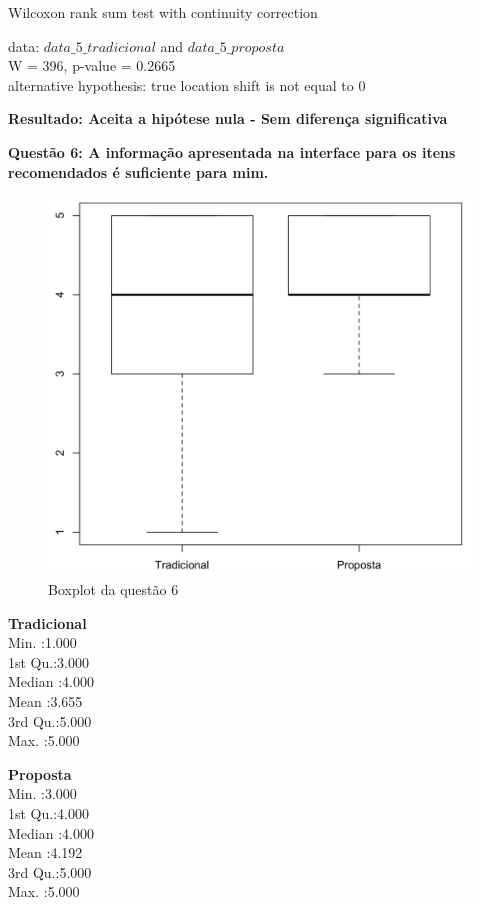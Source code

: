 Wilcoxon rank sum test with continuity correction

\noindent
data:  $data\_5\_tradicional$ and $data\_5\_proposta$\\
W = 396, p-value = 0.2665\\
alternative hypothesis: true location shift is not equal to 0

\textbf{Resultado: Aceita a hipótese nula - Sem diferença significativa}

\newpage
\textbf{Questão 6: A informação apresentada na interface para os itens recomendados é suficiente para mim.}

\begin{figure}[htb]
  \caption{\label{fig:questao6-boxplot}Boxplot da questão 6}
  \begin{center}
      \includegraphics[scale=0.4]{./Figuras/questao6-boxplot.png}
  \end{center}
\end{figure}

\begin{multicols}{2}

\noindent\textbf{Tradicional}\\
Min.   :1.000\\
1st Qu.:3.000\\
Median :4.000\\
Mean   :3.655\\
3rd Qu.:5.000\\
Max.   :5.000\\
\columnbreak

\noindent\textbf{Proposta}\\
Min.   :3.000\\
1st Qu.:4.000\\
Median :4.000\\
Mean   :4.192\\
3rd Qu.:5.000\\
Max.   :5.000
\end{multicols}

